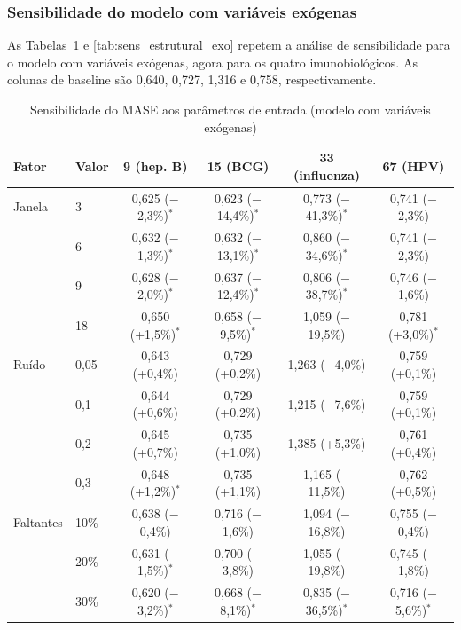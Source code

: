 \documentclass[
    12pt,
    openright,
    oneside,
    a4paper,
    english,
    brazil
]{abntex2}
\begin{document}
\subsubsection{Sensibilidade do modelo com variáveis exógenas}

As Tabelas~\ref{tab:sens_entrada_exo} e \ref{tab:sens_estrutural_exo} repetem a análise de sensibilidade para o modelo com variáveis exógenas, agora para os quatro imunobiológicos. As colunas de baseline são 0,640, 0,727, 1,316 e 0,758, respectivamente.

\begin{table}[htb]
  \centering
  \caption{Sensibilidade do MASE aos parâmetros de entrada (modelo com variáveis exógenas)}
  \label{tab:sens_entrada_exo}
  \footnotesize
  \setlength{\tabcolsep}{3pt}
  \begin{tabular}{llcccc}
    \toprule
    \textbf{Fator} & \textbf{Valor} & \textbf{9 (hep. B)} & \textbf{15 (BCG)} & \textbf{33 (influenza)} & \textbf{67 (HPV)} \\
    \midrule
    Janela & 3 & 0,625 ($-$2,3\%)$^{*}$ & 0,623 ($-$14,4\%)$^{*}$ & 0,773 ($-$41,3\%)$^{*}$ & 0,741 ($-$2,3\%) \\
     & 6 & 0,632 ($-$1,3\%)$^{*}$ & 0,632 ($-$13,1\%)$^{*}$ & 0,860 ($-$34,6\%)$^{*}$ & 0,741 ($-$2,3\%) \\
     & 9 & 0,628 ($-$2,0\%)$^{*}$ & 0,637 ($-$12,4\%)$^{*}$ & 0,806 ($-$38,7\%)$^{*}$ & 0,746 ($-$1,6\%) \\
     & 18 & 0,650 (+1,5\%)$^{*}$ & 0,658 ($-$9,5\%)$^{*}$ & 1,059 ($-$19,5\%) & 0,781 (+3,0\%)$^{*}$ \\
    \midrule
    Ruído & 0,05 & 0,643 (+0,4\%) & 0,729 (+0,2\%) & 1,263 ($-$4,0\%) & 0,759 (+0,1\%) \\
     & 0,1 & 0,644 (+0,6\%) & 0,729 (+0,2\%) & 1,215 ($-$7,6\%) & 0,759 (+0,1\%) \\
     & 0,2 & 0,645 (+0,7\%) & 0,735 (+1,0\%) & 1,385 (+5,3\%) & 0,761 (+0,4\%) \\
     & 0,3 & 0,648 (+1,2\%)$^{*}$ & 0,735 (+1,1\%) & 1,165 ($-$11,5\%) & 0,762 (+0,5\%) \\
    \midrule
    Faltantes & 10\% & 0,638 ($-$0,4\%) & 0,716 ($-$1,6\%) & 1,094 ($-$16,8\%) & 0,755 ($-$0,4\%) \\
     & 20\% & 0,631 ($-$1,5\%)$^{*}$ & 0,700 ($-$3,8\%) & 1,055 ($-$19,8\%) & 0,745 ($-$1,8\%) \\
     & 30\% & 0,620 ($-$3,2\%)$^{*}$ & 0,668 ($-$8,1\%)$^{*}$ & 0,835 ($-$36,5\%)$^{*}$ & 0,716 ($-$5,6\%)$^{*}$ \\
    \bottomrule
  \end{tabular}
\end{table}
\end{document}

